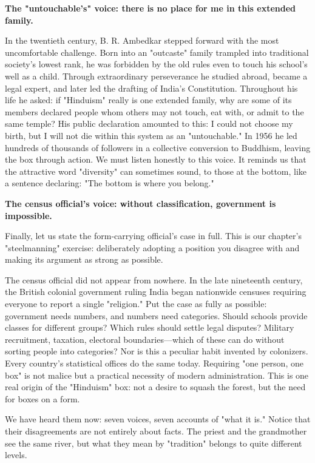 \textbf{The "untouchable's" voice: there is no place for me in this extended family.}

In the twentieth century, B. R. Ambedkar stepped forward with the most uncomfortable challenge. Born into an "outcaste" family trampled into traditional society's lowest rank, he was forbidden by the old rules even to touch his school's well as a child. Through extraordinary perseverance he studied abroad, became a legal expert, and later led the drafting of India's Constitution. Throughout his life he asked: if "Hinduism" really is one extended family, why are some of its members declared people whom others may not touch, eat with, or admit to the same temple? His public declaration amounted to this: I could not choose my birth, but I will not die within this system as an "untouchable." In 1956 he led hundreds of thousands of followers in a collective conversion to Buddhism, leaving the box through action. We must listen honestly to this voice. It reminds us that the attractive word "diversity" can sometimes sound, to those at the bottom, like a sentence declaring: "The bottom is where you belong."

\textbf{The census official's voice: without classification, government is impossible.}

Finally, let us state the form-carrying official's case in full. This is our chapter's "steelmanning" exercise: deliberately adopting a position you disagree with and making its argument as strong as possible.

The census official did not appear from nowhere. In the late nineteenth century, the British colonial government ruling India began nationwide censuses requiring everyone to report a single "religion." Put the case as fully as possible: government needs numbers, and numbers need categories. Should schools provide classes for different groups? Which rules should settle legal disputes? Military recruitment, taxation, electoral boundaries---which of these can do without sorting people into categories? Nor is this a peculiar habit invented by colonizers. Every country's statistical offices do the same today. Requiring "one person, one box" is not malice but a practical necessity of modern administration. This is one real origin of the "Hinduism" box: not a desire to squash the forest, but the need for boxes on a form.

We have heard them now: seven voices, seven accounts of "what it is." Notice that their disagreements are not entirely about facts. The priest and the grandmother see the same river, but what they mean by "tradition" belongs to quite different levels.

